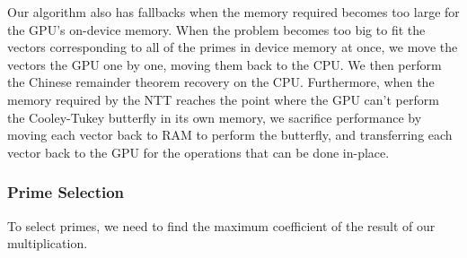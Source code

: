 
Our algorithm also has fallbacks when the memory required becomes too large for the 
GPU's on-device memory.
When the problem becomes too big to fit the vectors corresponding to all of the primes
in device memory at once, we move the vectors
the GPU one by one, moving them back to the CPU.
We then perform the Chinese remainder theorem recovery on the CPU.
Furthermore, when the memory required by the NTT reaches the point where the GPU can't perform the Cooley-Tukey butterfly in its own memory, we sacrifice performance by moving each vector back to RAM to perform the butterfly, and transferring each vector back to the GPU for the operations that can be done in-place.


\subsubsection{Prime Selection}



To select primes, we need to find the maximum coefficient of the result of our multiplication.

